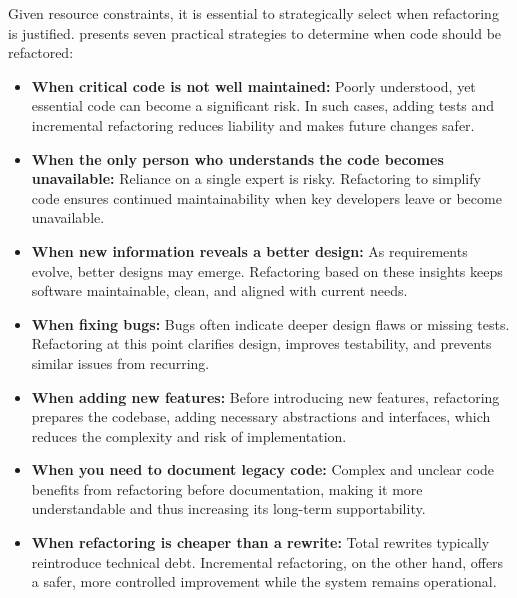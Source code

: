 
Given resource constraints, it is essential to strategically select when refactoring is justified. \citet{bernsteinLegacyCodeNine2015} presents seven practical strategies to determine when code should be refactored:
\begin{itemize}
    \item \textbf{When critical code is not well maintained:}  
    Poorly understood, yet essential code can become a significant risk. In such cases, adding tests and incremental refactoring reduces liability and makes future changes safer.

    \item \textbf{When the only person who understands the code becomes unavailable:}  
    Reliance on a single expert is risky. Refactoring to simplify code ensures continued maintainability when key developers leave or become unavailable.

    \item \textbf{When new information reveals a better design:}  
    As requirements evolve, better designs may emerge. Refactoring based on these insights keeps software maintainable, clean, and aligned with current needs.

    \item \textbf{When fixing bugs:}  
    Bugs often indicate deeper design flaws or missing tests. Refactoring at this point clarifies design, improves testability, and prevents similar issues from recurring.

    \item \textbf{When adding new features:}  
    Before introducing new features, refactoring prepares the codebase, adding necessary abstractions and interfaces, which reduces the complexity and risk of implementation.

    \item \textbf{When you need to document legacy code:}  
    Complex and unclear code benefits from refactoring before documentation, making it more understandable and thus increasing its long-term supportability.

    \item \textbf{When refactoring is cheaper than a rewrite:}  
    Total rewrites typically reintroduce technical debt. Incremental refactoring, on the other hand, offers a safer, more controlled improvement while the system remains operational.
\end{itemize}

